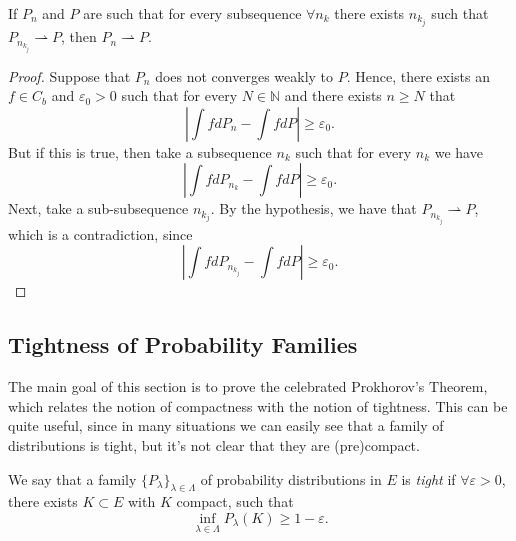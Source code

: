 \begin{lemma}
	If $P_n$ and $P$ are such that for every subsequence
	$\forall n_k$ there exists $n_{k_j}$ such that
	$P_{n_{k_j}} \rightharpoonup P$, then
	$P_n \rightharpoonup P$.
\end{lemma}
\begin{proof}
	Suppose that $P_n$ does not converges weakly to $P$. Hence,
	there exists an $f \in C_b$ and $\varepsilon_0 > 0$ such that
	for every $N \in \mathbb N$ and there exists $n \geq N$ that
	\begin{displaymath}
		\left |
		\int f dP_n - \int f dP
		\right | \geq \varepsilon_0.
	\end{displaymath}
	But if this is true, then take a subsequence $n_k$
	such that for every $n_k$ we have
	\begin{displaymath}
		\left |
		\int f dP_{n_k} - \int f dP
		\right | \geq \varepsilon_0.
	\end{displaymath}
	Next, take a sub-subsequence $n_{k_j}$. By the hypothesis,
	we have that $P_{n_{k_j}}\rightharpoonup P$, which
	is a contradiction, since
	\begin{displaymath}
		\left |
		\int f dP_{n_{k_j}} - \int f dP
		\right | \geq \varepsilon_0.
	\end{displaymath}

\end{proof}

\subsection{Tightness of Probability Families}

The main goal of this section is to prove the celebrated Prokhorov's
Theorem, which relates the notion of compactness
with the notion of tightness. This can be quite
useful, since in many situations we can easily see that
a family of distributions is tight, but it's not clear
that they are (pre)compact.

\begin{definition}[Tightness]
	We say that a family $\{P_\lambda\}_{\lambda \in \Lambda}$ of
	probability distributions in $E$ is \textit{tight}
	if $\forall \varepsilon >0$, there exists $K \subset E$
	with $K$ compact, such that
	\begin{equation}
		\inf_{\lambda \in \Lambda} P_{\lambda}(K) \geq 1-\varepsilon.
	\end{equation}
	\label{def:tight}
\end{definition}

